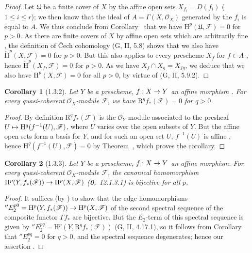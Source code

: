 \documentclass[oneside]{amsart}
\theoremstyle{ega-env-style}
\theoremstyle{ega-thm-env-style}
\newtheorem*{corollary}{Corollary}
\theoremstyle{ega-defn-env-style}
\def\mathcal{\mathscr}
\def\sh{\mathcal}                   %
\def\leq{\leqslant}                 %
\def\HH{\mathrm{H}}                 %
\def\CHH{\check{\HH}}               %
\def\RR{\mathrm{R}}                 %
\renewcommand{\to}{\mathchoice{\longrightarrow}{\rightarrow}{\rightarrow}{\rightarrow}}
\let\mapstoo\mapsto
\renewcommand{\mapsto}{\mathchoice{\longmapsto}{\mapstoo}{\mapstoo}{\mapstoo}}
\let\EGAOriginalLabel\label
\renewcommand{\label}[1]{\phantomsection\EGAOriginalLabel{#1}}
\begin{document}
\begin{proof}
Let $\mathfrak{U}$ be a finite cover of $X$ by the affine open sets $X_{f_i}=D(f_i)$ ($1\leq i\leq r$); we then know that the ideal of $A=\Gamma(X,\sh{O}_X)$ generated by the $f_i$ is equal to $A$.
We thus conclude from Corollary~ that we have $\HH^p(\mathfrak{U},\sh{F})=0$ for $p>0$.
As there are finite covers of $X$ by affine open sets which are arbitrarily fine , the definition of \v Cech cohomology (G, II, 5.8) shows that we also have $\CHH^p(X,\sh{F})=0$ for $p>0$.
But this also applies to every prescheme $X_f$ for $f\in A$ , hence $\CHH^p(X_f,\sh{F})=0$ for $p>0$.
As we have $X_f\cap X_g=X_{fg}$, we deduce that we also have $\HH^p(X,\sh{F})=0$ for all $p>0$, by virtue of (G, II, 5.9.2).
\end{proof}

\begin{corollary}[1.3.2]
\label{III.1.3.2}
Let $Y$ be a prescheme, $f:X\to Y$ an affine morphism .
For every quasi-coherent $\sh{O}_X$-module $\sh{F}$, we have $\RR^q f_*(\sh{F})=0$ for $q>0$.
\end{corollary}

\begin{proof}
By definition $\RR^q f_*(\sh{F})$ is the $\sh{O}_Y$-module associated to the presheaf $U\mapsto\HH^q(f^{-1}(U),\sh{F})$, where $U$ varies over the open subsets of $Y$.
But the affine open sets form a basis for $Y$, and for such an open set $U$, $f^{-1}(U)$ is affine , hence $\HH^q(f^{-1}(U),\sh{F})=0$ by Theorem~, which proves the corollary.
\end{proof}

\begin{corollary}[1.3.3]
\label{III.1.3.3}
Let $Y$ be a prescheme, $f:X\to Y$ an affine morphism.
For every quasi-coherent $\sh{O}_X$-module $\sh{F}$, the canonical homomorphism $\HH^p(Y,f_*(\sh{F}))\to\HH^p(X,\sh{F})$ (\textbf{0},~12.1.3.1) is bijective for all $p$.
\end{corollary}

\begin{proof}
It suffices (by ) to show that the edge homomorphisms $''E_2^{p0}=\HH^p(Y,f_*(\sh{F}))\to\HH^p(X,\sh{F})$ of the second spectral sequence of the composite functor $\Gamma f_*$ are bijective.
But the $E_2$-term of this spectral sequence is given by $''E_2^{pq}=\HH^p(Y,\RR^q f_*(\sh{F}))$ (G, II, 4.17.1), so it follows from Corollary~ that $''E_2^{pq}=0$ for $q>0$, and the spectral sequence degenerates; hence our assertion .
\end{proof}
\end{document}
